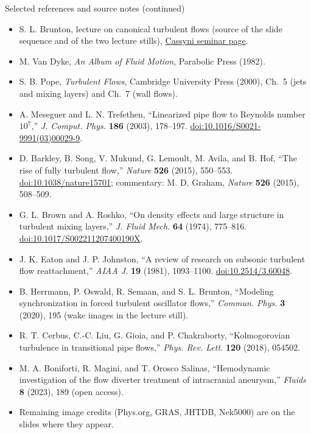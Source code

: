 \documentclass[aspectratio=169,11pt]{beamer}
\begin{document}
\begin{frame}{Selected references and source notes (continued)}
\scriptsize
\begin{itemize}
  \item S. L. Brunton, lecture on canonical turbulent flows (source of the slide sequence and of the two lecture stills), \href{https://cassyni.com/events/HsafxyMiJvA1JVCU9eef3T/seminar}{Cassyni seminar page}.
  \item M. Van Dyke, \emph{An Album of Fluid Motion}, Parabolic Press (1982).
  \item S. B. Pope, \emph{Turbulent Flows}, Cambridge University Press (2000), Ch.~5 (jets and mixing layers) and Ch.~7 (wall flows).
  \item A. Meseguer and L. N. Trefethen, ``Linearized pipe flow to Reynolds number $10^7$,'' \emph{J. Comput. Phys.} \textbf{186} (2003), 178--197. \href{https://doi.org/10.1016/S0021-9991(03)00029-9}{doi:10.1016/S0021-9991(03)00029-9}.
  \item D. Barkley, B. Song, V. Mukund, G. Lemoult, M. Avila, and B. Hof, ``The rise of fully turbulent flow,'' \emph{Nature} \textbf{526} (2015), 550--553. \href{https://doi.org/10.1038/nature15701}{doi:10.1038/nature15701}; commentary: M. D. Graham, \emph{Nature} \textbf{526} (2015), 508--509.
  \item G. L. Brown and A. Roshko, ``On density effects and large structure in turbulent mixing layers,'' \emph{J. Fluid Mech.} \textbf{64} (1974), 775--816. \href{https://doi.org/10.1017/S002211207400190X}{doi:10.1017/S002211207400190X}.
  \item J. K. Eaton and J. P. Johnston, ``A review of research on subsonic turbulent flow reattachment,'' \emph{AIAA J.} \textbf{19} (1981), 1093--1100. \href{https://doi.org/10.2514/3.60048}{doi:10.2514/3.60048}.
  \item B. Herrmann, P. Oswald, R. Semaan, and S. L. Brunton, ``Modeling synchronization in forced turbulent oscillator flows,'' \emph{Commun. Phys.} \textbf{3} (2020), 195 (wake images in the lecture still).
  \item R. T. Cerbus, C.-C. Liu, G. Gioia, and P. Chakraborty, ``Kolmogorovian turbulence in transitional pipe flows,'' \emph{Phys. Rev. Lett.} \textbf{120} (2018), 054502.
  \item M. A. Boniforti, R. Magini, and T. Orosco Salinas, ``Hemodynamic investigation of the flow diverter treatment of intracranial aneurysm,'' \emph{Fluids} \textbf{8} (2023), 189 (open access).
  \item Remaining image credits (Phys.org, GRAS, JHTDB, Nek5000) are on the slides where they appear.
\end{itemize}
\end{frame}
\end{document}
